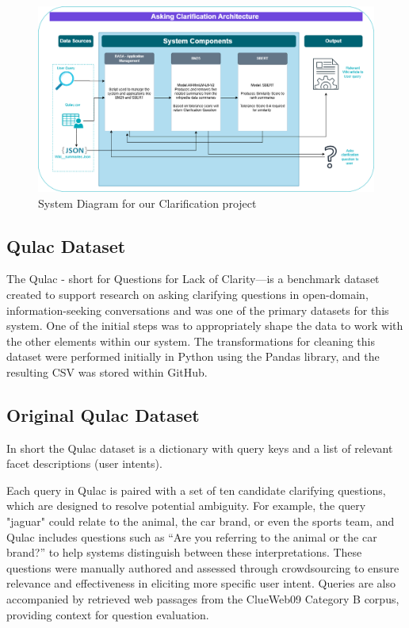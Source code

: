 \documentclass[11pt]{article}
\begin{document}
\begin{figure}[htbp]
  \includegraphics[width=\linewidth]{./img/system_diagram.png}
  \caption{System Diagram for our Clarification project}
  \label{fig:sys_diag}
\end{figure}

\subsection{Qulac Dataset}
The Qulac - short for Questions for Lack of Clarity—is a benchmark dataset created to support research on asking clarifying questions in open-domain, information-seeking conversations and was one of the primary datasets for this system. One of the initial steps was to appropriately shape the data to work with the other elements within our system. The transformations for cleaning this dataset were performed initially in Python using the Pandas library, and the resulting CSV was stored within GitHub.

\subsection{Original Qulac Dataset}
In short the Qulac dataset is a dictionary with query keys and a list of relevant facet descriptions (user intents).

Each query in Qulac is paired with a set of ten candidate clarifying questions, which are designed to resolve potential ambiguity. For example, the query "jaguar" could relate to the animal, the car brand, or even the sports team, and Qulac includes questions such as “Are you referring to the animal or the car brand?” to help systems distinguish between these interpretations. These questions were manually authored and assessed through crowdsourcing to ensure relevance and effectiveness in eliciting more specific user intent. Queries are also accompanied by retrieved web passages from the ClueWeb09 Category B corpus, providing context for question evaluation.
\end{document}
